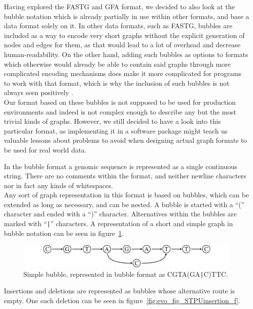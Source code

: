 \documentclass[a4paper,12pt,twoside,BCOR=10mm]{scrbook}
\def\pipe{\texttt{|}}
\begin{document}
Having explored the FASTG and GFA format, we decided to also look
at the bubble notation which is already partially in use within other formats,
and base a data format solely on it.
In other data formats, such as FASTG, bubbles are included as a way to encode very short graphs
without the explicit generation of nodes and edges for them,
as that would lead to a lot of overhead and decrease human-readability.
On the other hand, adding such bubbles as options to formats which otherwise
would already be able to contain said graphs through more complicated encoding mechanisms
does make it more complicated for programs to work with that format, which is why the inclusion
of such bubbles is not always seen positively \citep{specGFA1}. \\
Our format based on these bubbles
is not supposed to be used for production environments and indeed
is not complex enough to describe any but the most trivial kinds of graphs.
However, we still decided to have a look into this particular format,
as implementing it in a software package might teach us valuable lessons
about problems to avoid when designing actual graph formats to be used for real world data.

In the bubble format a genomic sequence is represented as a single continuous string.
There are no comments within the format,
and neither newline characters nor in fact any kinds of whitespaces. \\
Any sort of graph representation in this format is based on bubbles, which can be extended as long as necessary,
and can be nested. A bubble is started with a “(” character and ended
with a “)” character. Alternatives within the bubbles are marked with “{\!\pipe}”
characters.
A representation of a short and simple graph in bubble notation can be seen in figure~\ref{fig:evo_fig_STPUbubble_f}.

\begin{figure}[!htb]
\centering
\includegraphics[width=\textwidth]{evo_fig_STPUbubble_f.pdf}
\caption[Simple bubble in bubble format]{Simple bubble, represented in bubble format as \textup{CGTA(GA\pipe C)TTC}.} \label{fig:evo_fig_STPUbubble_f}
\end{figure}

Insertions and deletions are represented as bubbles whose alternative route is empty.
One such deletion can be seen in figure~\ref{fig:evo_fig_STPUinsertion_f}.
\end{document}
